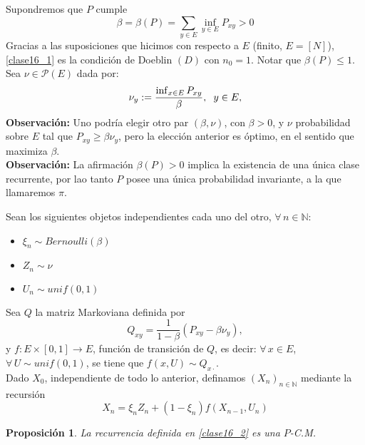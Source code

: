 \documentclass[a4paper]{article}
\newtheorem{prop}{Proposici\'on}
\numberwithin{equation}{subsection}
\numberwithin{definicion}{subsection}
\def\N{\mathbb N}
\begin{document}
Supondremos que $P$ cumple  
\begin{equation}
    \beta = \beta(P) = \sum_{y\in E}\inf_{y\in E}P_{xy} > 0
    \label{clase16_1}
\end{equation}
Gracias a las suposiciones que hicimos con respecto a $E$ (finito, $E=[N]$), \ref{clase16_1} es la condición de Doeblin $(D)$ con $n_0=1$. Notar que $\beta(P) \leq 1$.\\
Sea $\nu \in \mathcal{P}(E)$ dada por:
\[\nu_y := \frac{\inf_{x\in E}P_{xy}}{\beta},\hspace{0.2cm}y\in E,\]
\textbf{Observación: }Uno podría elegir otro par $(\beta,\nu)$, con $\beta >0$, y $\nu$ probabilidad sobre $E$ tal que $P_{xy}\geq \beta \nu_y$, pero la elección anterior es óptimo, en el sentido que maximiza $\beta$.\\ \newline
\textbf{Observación: }La afirmación $\beta(P)>0$ implica la existencia de una única clase recurrente, por lao tanto $P$ posee una única probabilidad invariante, a la que llamaremos $\pi$.\\ \newline

Sean los siguientes objetos independientes cada uno del otro, $\forall\,n\in\N$:
\begin{itemize}
    \item $\xi_n \sim Bernoulli(\beta)$
    \item $Z_n \sim \nu$
    \item $U_n \sim unif(0,1)$
\end{itemize}
Sea $Q$ la matriz Markoviana definida por
\[Q_{xy} = \frac{1}{1-\beta}(P_{xy}-\beta \nu_y),\]
y $f:E\times [0,1]\rightarrow E$, función de transición de $Q$, es decir: $\forall\,x\in E$, $\forall\,U\sim unif(0,1)$, se tiene que $f(x,U)\sim Q_{x\cdot}$.\\ \newline
Dado $X_0$, independiente de todo lo anterior, definamos $(X_n)_{n\in \N}$ mediante la recursión
\begin{equation}
    X_n = \xi_n Z_n + (1-\xi_n)f(X_{n-1},U_n)
    \label{clase16_2}
\end{equation}
\begin{prop}
\label{porp}
La recurrencia definida en \ref{clase16_2} es una $P$-C.M.
\end{prop}
\end{document}
